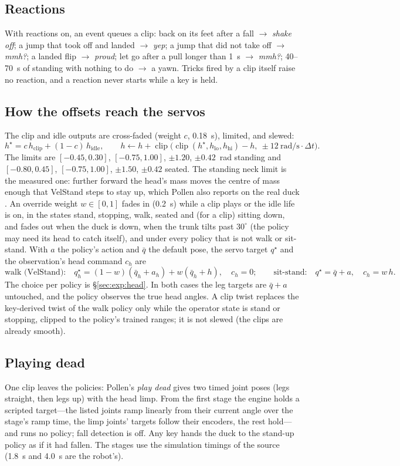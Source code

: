 \documentclass[11pt]{article}
\begin{document}
\subsection{Reactions}
With reactions on, an event queues a clip: back on its feet after a fall $\to$ \emph{shake off}; a jump that took off
and landed $\to$ \emph{yep}; a jump that did not take off $\to$ \emph{mmh?}; a landed flip $\to$ \emph{proud}; let go
after a pull longer than 1~s $\to$ \emph{mmh?}; 40--70~s of standing with nothing to do $\to$ a yawn. Tricks fired
by a clip itself raise no reaction, and a reaction never starts while a key is held.

\subsection{How the offsets reach the servos}\label{sec:apply}
The clip and idle outputs are cross-faded (weight $c$, 0.18~s), limited, and slewed:
\[
  h^\star = c\,h_\text{clip} + (1-c)\,h_\text{idle},\qquad
  h \leftarrow h + \operatorname{clip}\!\big(\operatorname{clip}(h^\star, h_\text{lo}, h_\text{hi}) - h,\ \pm 12~\text{rad/s}\cdot\Delta t\big).
\]
The limits are $[-0.45, 0.30]$, $[-0.75, 1.00]$, $\pm1.20$, $\pm0.42$~rad standing and $[-0.80, 0.45]$,
$[-0.75,1.00]$, $\pm1.50$, $\pm0.42$ seated. The standing neck limit is the measured one: further forward the head's
mass moves the centre of mass enough that VelStand steps to stay up, which Pollen also reports on the real duck
\cite{emotions}. An override weight $w\in[0,1]$ fades in (0.2~s) while a clip plays or the idle life is on, in the
states stand, stopping, walk, seated and (for a clip) sitting down, and fades out when the duck is down, when the
trunk tilts past $30^\circ$ (the policy may need its head to catch itself), and under every policy that is not walk
or sit-stand. With $a$ the policy's action and $\bar q$ the default pose, the servo target $q^\star$ and the
observation's head command $c_h$ are
\[
\text{walk (VelStand):}\quad q^\star_h = (1-w)(\bar q_h + a_h) + w(\bar q_h + h),\quad c_h = 0;\qquad
\text{sit-stand:}\quad q^\star = \bar q + a,\quad c_h = w\,h .
\]
The choice per policy is \S\ref{sec:exp:head}. In both cases the leg targets are $\bar q + a$ untouched, and the
policy observes the true head angles. A clip twist replaces the key-derived twist of the walk policy only while
the operator state is stand or stopping, clipped to the policy's trained ranges; it is not slewed (the clips are
already smooth).

\subsection{Playing dead}
One clip leaves the policies: Pollen's \emph{play dead} gives two timed joint poses (legs straight, then legs up)
with the head limp. From the first stage the engine holds a scripted target---the listed joints ramp linearly from
their current angle over the stage's ramp time, the limp joints' targets follow their encoders, the rest hold---and
runs no policy; fall detection is off. Any key hands the duck to the stand-up policy as if it had fallen. The stages
use the simulation timings of the source (1.8~s and 4.0~s are the robot's).
\end{document}
